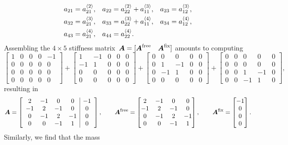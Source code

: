 \begin{example}
\begin{align*}
a_{21}&=a^{\langle2\rangle}_{21},&
a_{22}&=a^{\langle2\rangle}_{22}+a^{\langle3\rangle}_{11},&
a_{23}&=a^{\langle3\rangle}_{12},\\
a_{32}&=a^{\langle3\rangle}_{21},&
a_{33}&=a^{\langle3\rangle}_{22}+a^{\langle4\rangle}_{11},&
a_{34}&=a^{\langle4\rangle}_{12},\\
a_{43}&=a^{\langle4\rangle}_{21},&
a_{44}&=a^{\langle4\rangle}_{22}.&&
\end{align*}
Assembling the $4\times5$ stiffness 
matrix~$\boldsymbol{A}=[\boldsymbol{A}^{\mathrm{free}}\quad\boldsymbol{A}^{\mathrm{fix}}]$ 
amounts to computing
\[
\left[
\begin{array}{cccc|c}1&0&0&0&-1\\0&0&0&0&0\\0&0&0&0&0\\0&0&0&0&0\end{array}
\right]+\left[
\begin{array}{cccc|c}1&-1&0&0&0\\-1&1&0&0&0\\0&0&0&0&0\\0&0&0&0&0\end{array}
\right]+\left[
\begin{array}{cccc|c}0&0&0&0&0\\0&1&-1&0&0\\0&-1&1&0&0\\0&0&0&0&0\end{array}
\right]+\left[
\begin{array}{cccc|c}0&0&0&0&0\\0&0&0&0&0\\0&0&1&-1&0\\0&0&-1&1&0\end{array}
\right],
\]
resulting in
\[
\boldsymbol{A}=\left[\begin{array}{cccc|c}
2&-1&0&0&-1\\ -1&2&-1&0&0\\ 0&-1&2&-1&0\\ 0&0&-1&1&0\end{array}\right],\qquad
\boldsymbol{A}^{\mathrm{free}}=\begin{bmatrix}
2&-1&0&0\\ -1&2&-1&0\\ 0&-1&2&-1\\ 0&0&-1&1\end{bmatrix},\qquad
\boldsymbol{A}^{\mathrm{fix}}=\begin{bmatrix}-1\\ 0\\ 0\\ 0\end{bmatrix}.
\]
Similarly, we find that the mass 

\end{example}
